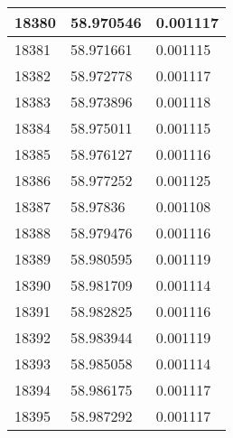 \documentclass[a4paper,9pt]{beamer}
\begin{document}
{\begin{table}[htbp]
\begin{minipage}{0.5\linewidth}
\begin{tabular}{|l|l|l|}
  \end{tabular}
  \end{minipage}
  \begin{minipage}{0.4\linewidth}%
  \begin{tabular}{|l|l|l|}
    \hline 
18380&58.970546&0.001117\\
\hline
18381&58.971661&\cellcolor {red}0.001115\\
\hline
18382&58.972778&\cellcolor {red}0.001117\\
\hline
18383&58.973896&\cellcolor {red}0.001118\\
\hline
18384&58.975011&\cellcolor {red}0.001115\\
\hline
18385&58.976127&\cellcolor {red}0.001116\\
\hline
18386&58.977252&\cellcolor {red}0.001125\\
\hline
18387&58.97836&\cellcolor {yellow}0.001108\\
\hline
18388&58.979476&\cellcolor {red}0.001116\\
\hline
18389&58.980595&\cellcolor {red}0.001119\\
\hline
18390&58.981709&\cellcolor {red}0.001114\\
\hline
18391&58.982825&\cellcolor {red}0.001116\\
\hline
18392&58.983944&\cellcolor {red}0.001119\\
\hline
18393&58.985058&\cellcolor {red}0.001114\\
\hline
18394&58.986175&\cellcolor {red}0.001117\\
\hline
18395&58.987292&0.001117\\

\end{tabular}
\end{minipage}
\end{table}}
\end{document}
